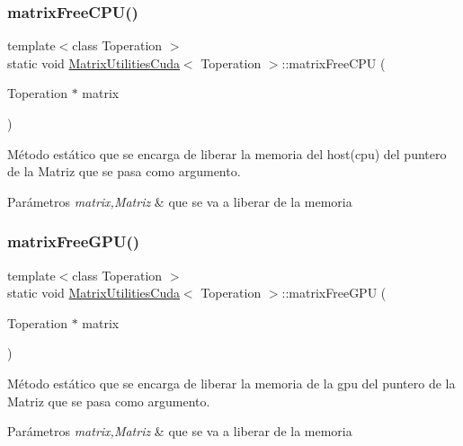\subsubsection{\texorpdfstring{matrix\+Free\+C\+P\+U()}{matrixFreeCPU()}}
{\footnotesize\ttfamily template$<$class Toperation $>$ \\
static void \hyperlink{classMatrixUtilitiesCuda}{Matrix\+Utilities\+Cuda}$<$ Toperation $>$\+::matrix\+Free\+C\+PU (\begin{DoxyParamCaption}\item[{Toperation $\ast$}]{matrix }\end{DoxyParamCaption})\hspace{0.3cm}{\ttfamily [static]}}



Método estático que se encarga de liberar la memoria del host(cpu) del puntero de la Matriz que se pasa como argumento. 


\begin{DoxyParams}{Parámetros}
{\em matrix,Matriz} & que se va a liberar de la memoria \\
\hline
\end{DoxyParams}
\mbox{\label{classMatrixUtilitiesCuda_adcb5062c6eb05a5aa2fdecaf31cab16a}} 
\subsubsection{\texorpdfstring{matrix\+Free\+G\+P\+U()}{matrixFreeGPU()}}
{\footnotesize\ttfamily template$<$class Toperation $>$ \\
static void \hyperlink{classMatrixUtilitiesCuda}{Matrix\+Utilities\+Cuda}$<$ Toperation $>$\+::matrix\+Free\+G\+PU (\begin{DoxyParamCaption}\item[{Toperation $\ast$}]{matrix }\end{DoxyParamCaption})\hspace{0.3cm}{\ttfamily [static]}}



Método estático que se encarga de liberar la memoria de la gpu del puntero de la Matriz que se pasa como argumento. 


\begin{DoxyParams}{Parámetros}
{\em matrix,Matriz} & que se va a liberar de la memoria \\
\hline
\end{DoxyParams}
\mbox{\label{classMatrixUtilitiesCuda_a1e213a73a8c2a80a2abaa7b67b23b96f}} 
